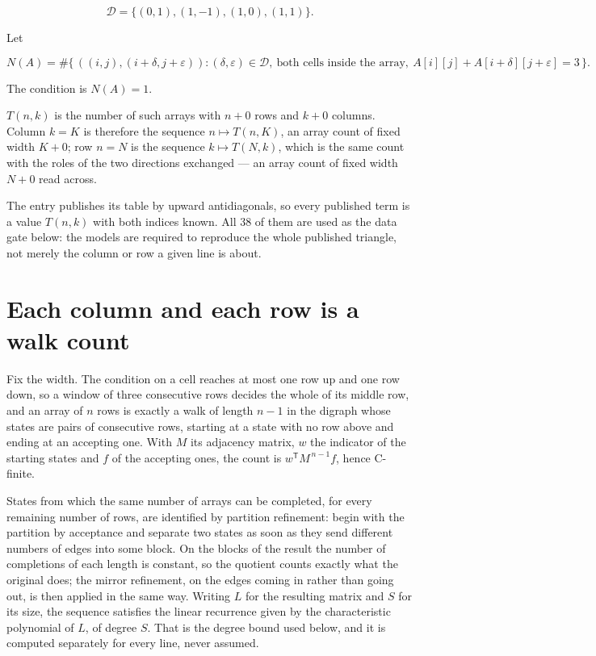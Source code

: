 \documentclass[11pt]{article}
\theoremstyle{definition}
\begin{document}
\[\mathcal{D} = \{(0,1), (1,-1), (1,0), (1,1)\}.\]

Let

\[N(A) = \#\bigl\{\,((i,j),(i{+}\delta,j{+}\varepsilon)) : (\delta,\varepsilon) \in \mathcal{D},\ \text{both cells inside the array},\ A[i][j] + A[i{+}\delta][j{+}\varepsilon] = 3\,\bigr\}.\]

The condition is $N(A) = 1$.

$T(n,k)$ is the number of such arrays with $n + 0$ rows and $k + 0$ columns. Column $k = K$ is therefore the sequence $n \mapsto T(n,K)$, an array count of fixed width $K + 0$; row $n = N$ is the sequence $k \mapsto T(N,k)$, which is the same count with the roles of the two directions exchanged --- an array count of fixed width $N + 0$ read across.

The entry publishes its table by upward antidiagonals, so every published term is a value $T(n,k)$ with both indices known. All 38 of them are used as the data gate below: the models are required to reproduce the whole published triangle, not merely the column or row a given line is about.

\section{Each column and each row is a walk count}

Fix the width. The condition on a cell reaches at most one row up and one row down, so a window of three consecutive rows decides the whole of its middle row, and an array of $n$ rows is exactly a walk of length $n-1$ in the digraph whose states are pairs of consecutive rows, starting at a state with no row above and ending at an accepting one. With $M$ its adjacency matrix, $w$ the indicator of the starting states and $f$ of the accepting ones, the count is $w^{\mathsf T}M^{\,n-1}f$, hence C-finite.

States from which the same number of arrays can be completed, for every remaining number of rows, are identified by partition refinement: begin with the partition by acceptance and separate two states as soon as they send different numbers of edges into some block. On the blocks of the result the number of completions of each length is constant, so the quotient counts exactly what the original does; the mirror refinement, on the edges coming in rather than going out, is then applied in the same way. Writing $L$ for the resulting matrix and $S$ for its size, the sequence satisfies the linear recurrence given by the characteristic polynomial of $L$, of degree $S$. That is the degree bound used below, and it is computed separately for every line, never assumed.
\end{document}
